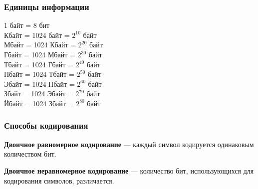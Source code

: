 \begin{frame}
\frametitle{Единицы информации}

1 байт  =  8 бит\\ Кбайт  =  1024 байт  =  $2^{10}$ байт\\ Мбайт  =  1024 Кбайт  =  $2^{20}$ байт\\ Гбайт  =  1024 Мбайт  =  $2^{30}$ байт\\ Тбайт  =  1024 Гбайт  =  $2^{40}$ байт\\ Пбайт  =  1024 Тбайт  =  $2^{50}$ байт\\ Эбайт  =  1024 Пбайт  =  $2^{60}$ байт\\ Збайт  =  1024 Эбайт  =  $2^{70}$ байт\\ Йбайт  =  1024 Збайт  =  $2^{80}$ байт\\

\end{frame}

\begin{frame}
\frametitle{Способы кодирования}

\textbf{Двоичное равномерное кодирование} --- каждый символ кодируется одинаковым количеством бит.

\pause
\textbf{Двоичное неравномерное кодирование} --- количество бит, использующихся для кодирования символов, различается.

\end{frame}

